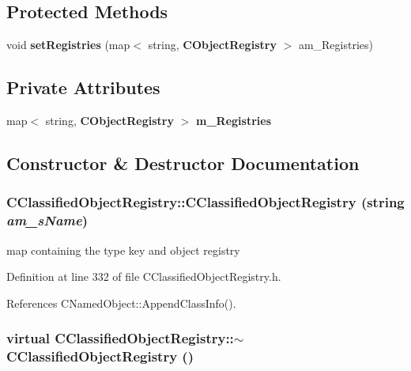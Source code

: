 \subsection*{Protected Methods}
\begin{CompactItemize}
\item 
void {\bf set\-Registries} (map$<$ string, {\bf CObject\-Registry} $>$ am\_\-Registries)
\end{CompactItemize}
\subsection*{Private Attributes}
\begin{CompactItemize}
\item 
map$<$ string, {\bf CObject\-Registry} $>$ {\bf m\_\-Registries}
\end{CompactItemize}


\subsection{Constructor \& Destructor Documentation}
\subsubsection{\setlength{\rightskip}{0pt plus 5cm}CClassified\-Object\-Registry::CClassified\-Object\-Registry (string {\em am\_\-s\-Name})\hspace{0.3cm}{\tt  [inline]}}\label{classCClassifiedObjectRegistry_a0}


map containing the type key and object registry 

Definition at line 332 of file CClassified\-Object\-Registry.h.

References CNamed\-Object::Append\-Class\-Info().
\subsubsection{\setlength{\rightskip}{0pt plus 5cm}virtual CClassified\-Object\-Registry::$\sim$CClassified\-Object\-Registry ()\hspace{0.3cm}{\tt  [inline, virtual]}}\label{classCClassifiedObjectRegistry_a1}




